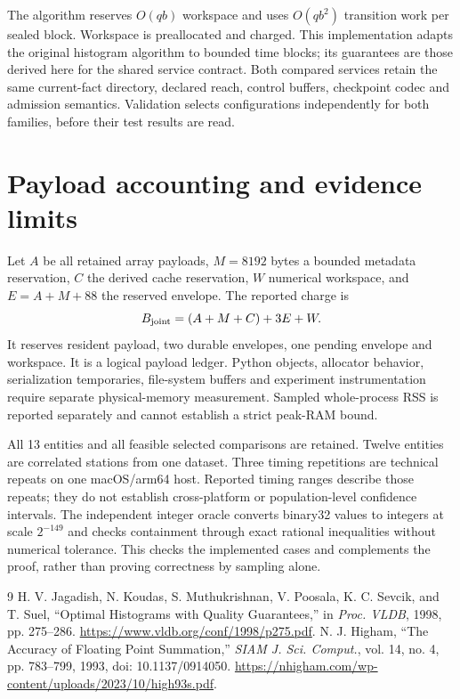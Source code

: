 \documentclass[10pt]{article}
\begin{document}
The algorithm reserves $O(qb)$ workspace and uses $O(qb^2)$ transition work per sealed block. Workspace is preallocated and charged. This implementation adapts the original histogram algorithm to bounded time blocks; its guarantees are those derived here for the shared service contract. Both compared services retain the same current-fact directory, declared reach, control buffers, checkpoint codec and admission semantics. Validation selects configurations independently for both families, before their test results are read.

\section{Payload accounting and evidence limits}
Let $A$ be all retained array payloads, $M=8192$ bytes a bounded metadata reservation, $C$ the derived cache reservation, $W$ numerical workspace, and $E=A+M+88$ the reserved envelope. The reported charge is
\begin{equation}
 B_{\rm joint}=(A+M+C)+3E+W.
\end{equation}
It reserves resident payload, two durable envelopes, one pending envelope and workspace. It is a logical payload ledger. Python objects, allocator behavior, serialization temporaries, file-system buffers and experiment instrumentation require separate physical-memory measurement. Sampled whole-process RSS is reported separately and cannot establish a strict peak-RAM bound.

All 13 entities and all feasible selected comparisons are retained. Twelve entities are correlated stations from one dataset. Three timing repetitions are technical repeats on one macOS/arm64 host. Reported timing ranges describe those repeats; they do not establish cross-platform or population-level confidence intervals. The independent integer oracle converts binary32 values to integers at scale $2^{-149}$ and checks containment through exact rational inequalities without numerical tolerance. This checks the implemented cases and complements the proof, rather than proving correctness by sampling alone.

\begin{thebibliography}{9}
 H. V. Jagadish, N. Koudas, S. Muthukrishnan, V. Poosala, K. C. Sevcik, and T. Suel, ``Optimal Histograms with Quality Guarantees,'' in \emph{Proc. VLDB}, 1998, pp. 275--286. \url{https://www.vldb.org/conf/1998/p275.pdf}.
 N. J. Higham, ``The Accuracy of Floating Point Summation,'' \emph{SIAM J. Sci. Comput.}, vol. 14, no. 4, pp. 783--799, 1993, doi: 10.1137/0914050. \url{https://nhigham.com/wp-content/uploads/2023/10/high93s.pdf}.
\end{thebibliography}
\end{document}
